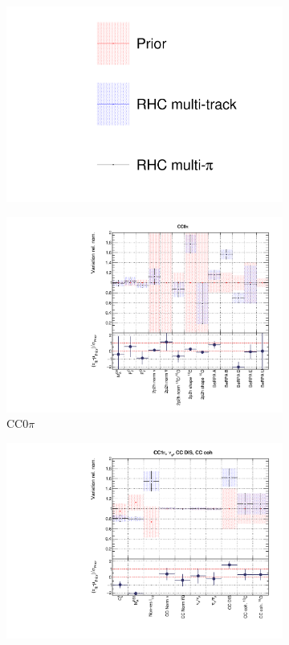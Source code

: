 \begin{figure}
\centering
\begin{subfigure}{0.95\textwidth}
  \centering
  \includegraphics[width=0.25\linewidth]{figs/rhcmpdat248_leg}	
\end{subfigure}
\begin{subfigure}{0.49\textwidth}
  \centering
  \includegraphics[width=0.95\linewidth]{figs/rhcmpdatxsec248_1}
  \caption{CC0$\pi$}
\end{subfigure}
\begin{subfigure}{0.49\textwidth}
  \centering
  \includegraphics[width=0.95\linewidth]{figs/rhcmpdatxsec248_2}

\end{subfigure}
\end{figure}
